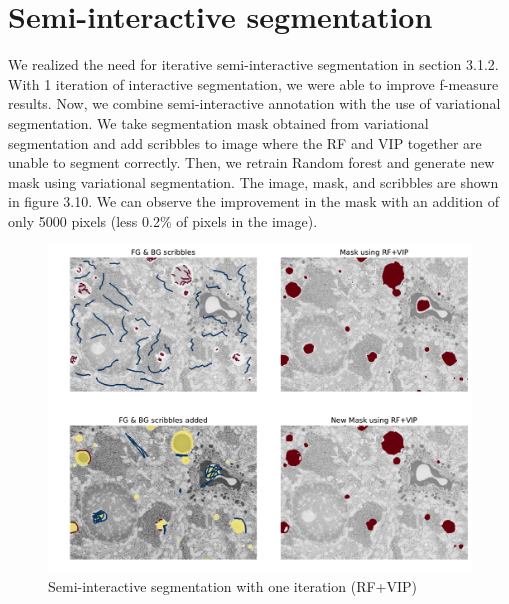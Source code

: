 \section{Semi-interactive segmentation}
We realized the need for iterative semi-interactive segmentation in section 3.1.2. With 1 iteration of interactive segmentation, we were able to improve f-measure results. Now, we combine semi-interactive annotation with the use of variational segmentation. We take segmentation mask obtained from variational segmentation and add scribbles to image where the RF and VIP together are unable to segment correctly. Then, we retrain Random forest and generate new mask using variational segmentation. The image, mask, and scribbles are shown in figure 3.10. We can observe the improvement in the mask with an addition of only 5000 pixels (less 0.2\% of pixels in the image).
\begin{figure}[h!] \label{fig:semi-vip}
 \includegraphics[width=1.0\linewidth]{figures/semi_inter_vip.pdf}
\caption{Semi-interactive segmentation with one iteration (RF+VIP)}
\end{figure}

